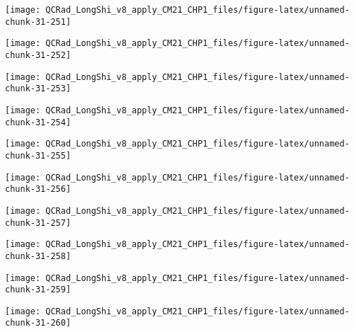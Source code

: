 \documentclass[
  10pt,
  a4paper,oneside]{article}
\begin{document}
\begin{center}\texttt{[image: QCRad\_LongShi\_v8\_apply\_CM21\_CHP1\_files/figure-latex/unnamed-chunk-31-251]} \end{center}

\begin{center}\texttt{[image: QCRad\_LongShi\_v8\_apply\_CM21\_CHP1\_files/figure-latex/unnamed-chunk-31-252]} \end{center}

\begin{center}\texttt{[image: QCRad\_LongShi\_v8\_apply\_CM21\_CHP1\_files/figure-latex/unnamed-chunk-31-253]} \end{center}

\begin{center}\texttt{[image: QCRad\_LongShi\_v8\_apply\_CM21\_CHP1\_files/figure-latex/unnamed-chunk-31-254]} \end{center}

\begin{center}\texttt{[image: QCRad\_LongShi\_v8\_apply\_CM21\_CHP1\_files/figure-latex/unnamed-chunk-31-255]} \end{center}

\begin{center}\texttt{[image: QCRad\_LongShi\_v8\_apply\_CM21\_CHP1\_files/figure-latex/unnamed-chunk-31-256]} \end{center}

\begin{center}\texttt{[image: QCRad\_LongShi\_v8\_apply\_CM21\_CHP1\_files/figure-latex/unnamed-chunk-31-257]} \end{center}

\begin{center}\texttt{[image: QCRad\_LongShi\_v8\_apply\_CM21\_CHP1\_files/figure-latex/unnamed-chunk-31-258]} \end{center}

\begin{center}\texttt{[image: QCRad\_LongShi\_v8\_apply\_CM21\_CHP1\_files/figure-latex/unnamed-chunk-31-259]} \end{center}

\begin{center}\texttt{[image: QCRad\_LongShi\_v8\_apply\_CM21\_CHP1\_files/figure-latex/unnamed-chunk-31-260]} \end{center}
\end{document}
